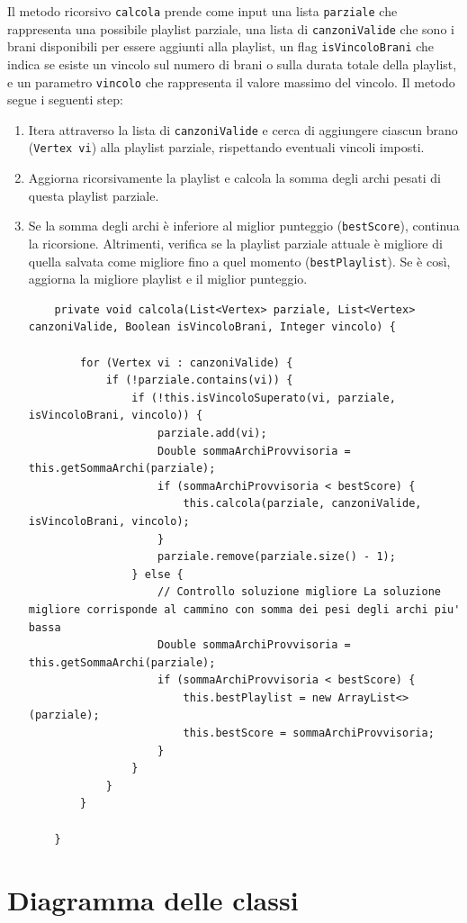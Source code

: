 \documentclass[12pt, a4paper]{article}
\begin{document}
Il metodo ricorsivo \texttt{calcola} prende come input una lista \texttt{parziale} che rappresenta una possibile playlist parziale, una lista di \texttt{canzoniValide} che sono i brani disponibili per essere aggiunti alla playlist, un flag \texttt{isVincoloBrani} che indica se esiste un vincolo sul numero di brani o sulla durata totale della playlist, e un parametro \texttt{vincolo} che rappresenta il valore massimo del vincolo.
Il metodo segue i seguenti step:
\begin{enumerate}
\item Itera attraverso la lista di \texttt{canzoniValide} e cerca di aggiungere ciascun brano (\texttt{Vertex vi}) alla playlist parziale, rispettando eventuali vincoli imposti.
\item Aggiorna ricorsivamente la playlist e calcola la somma degli archi pesati di questa playlist parziale.
\item Se la somma degli archi è inferiore al miglior punteggio (\texttt{bestScore}), continua la ricorsione. Altrimenti, verifica se la playlist parziale attuale è migliore di quella salvata come migliore fino a quel momento (\texttt{bestPlaylist}). Se è così, aggiorna la migliore playlist e il miglior punteggio.

\begin{lstlisting}
	private void calcola(List<Vertex> parziale, List<Vertex> canzoniValide, Boolean isVincoloBrani, Integer vincolo) {

		for (Vertex vi : canzoniValide) {
			if (!parziale.contains(vi)) {
				if (!this.isVincoloSuperato(vi, parziale, isVincoloBrani, vincolo)) {
					parziale.add(vi);
					Double sommaArchiProvvisoria = this.getSommaArchi(parziale);
					if (sommaArchiProvvisoria < bestScore) {
						this.calcola(parziale, canzoniValide, isVincoloBrani, vincolo);
					}
					parziale.remove(parziale.size() - 1);
				} else {
					// Controllo soluzione migliore La soluzione migliore corrisponde al cammino con somma dei pesi degli archi piu' bassa
					Double sommaArchiProvvisoria = this.getSommaArchi(parziale);
					if (sommaArchiProvvisoria < bestScore) {
						this.bestPlaylist = new ArrayList<>(parziale);
						this.bestScore = sommaArchiProvvisoria;
					}
				}
			}
		}

	}
\end{lstlisting}
\end{enumerate}

\newpage
\section{Diagramma delle classi}
\end{document}
